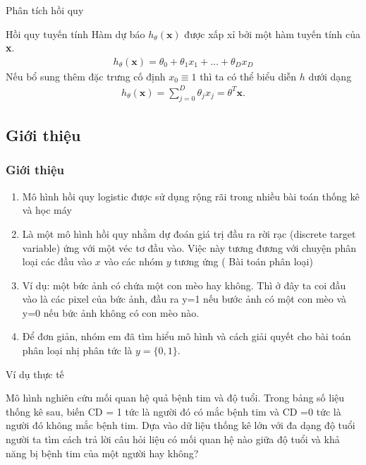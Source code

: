\documentclass[notheorems,hyperref={bookmarks=true}]{beamer}
\theoremstyle{plain}
\begin{document}
\begin{footnotesize}
\begin{frame}{Phân tích hồi quy}
\end{frame}
\begin{frame}{Hồi quy tuyến tính}
Hàm dự báo $h_{\theta}(\textbf{x})$ được xấp xỉ bởi một hàm tuyến tính của \textbf{x}.
\begin{align*}
   h_{\theta}(\textbf{x})=\theta_0 + \theta_1x_1 +\dots +\theta_Dx_D
\end{align*}
Nếu bổ sung thêm đặc trưng cố định $x_0 \equiv 1$  thì ta có thể biểu diễn $h$  dưới
dạng
 \begin{align*}
     h_{\theta}(\textbf{x})= \sum_{j=0}^D \theta_jx_j = \theta^T\textbf{x}.
 \end{align*}  
\end{frame}

\subsection{Giới thiệu}
\begin{frame}
\frametitle{Giới thiệu }
\begin{enumerate}
    \item Mô hình hồi quy logistic được sử dụng rộng rãi trong nhiều bài toán
thống kê và học máy
\item Là một mô hình hồi quy nhằm dự đoán giá trị đầu ra rời rạc (discrete target variable) ứng với một véc tơ đầu vào. Việc này tương đương với chuyện phân loại các đầu vào $x$ vào các nhóm $y$ tương ứng ( Bài toán phân loại)
\item Ví dụ: một bức ảnh có chứa một con mèo hay không. Thì ở đây ta coi đầu vào là các pixel của bức ảnh, đầu ra  y=1 nếu bước ảnh có một con mèo và y=0 nếu bức ảnh không có con mèo nào. 
\item Để đơn giản, nhóm em đã tìm hiểu mô hình và cách giải quyết cho bài toán phân loại nhị phân tức là $y= \{0,1\}.$



\end{enumerate}
\end{frame}

\begin{frame}{Ví dụ thực tế}

Mô hình nghiên cứu mối quan hệ quả bệnh tim và độ tuổi.
Trong bảng số liệu thống kê sau, biến CD = 1 tức là người đó có mắc bệnh tim và CD =0 tức là người đó không mắc bệnh tim. Dựa vào dữ liệu thống kê lớn với đa dạng độ tuổi người ta tìm cách trả lời câu hỏi liệu có mối quan hệ nào giữa độ tuổi và khả năng bị bệnh tim của một người hay không?
\begin{figure}
    \centering
    

\end{figure}
\end{frame}
\end{footnotesize}
\end{document}
